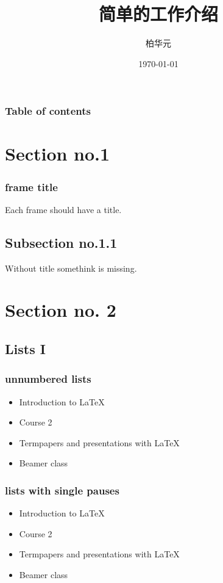 \documentclass[hyperref={pdfpagelabels=false}]{beamer}
\title{简单的工作介绍}
\author{柏华元}
\date{\today}
\begin{document}
\begin{frame}
\titlepage
\end{frame} 


\begin{frame}
\frametitle{Table of contents}
\tableofcontents
\end{frame} 


\section{Section no.1} 
\begin{frame}
\frametitle{frame title} 
Each frame should have a title.
\end{frame}
\subsection{Subsection no.1.1  }
\begin{frame}
Without title somethink is missing. 
\end{frame}


\section{Section no. 2} 
\subsection{Lists I}
\begin{frame}
\frametitle{unnumbered lists}
\begin{itemize}
\item Introduction to  \LaTeX{}  
\item Course 2 
\item Termpapers and presentations with \LaTeX{}  
\item Beamer class
\end{itemize} 
\end{frame}

\begin{frame}\frametitle{lists with single pauses}
\begin{itemize}
\item Introduction to  \LaTeX{}  \pause 
\item Course 2 \pause 
\item Termpapers and presentations with \LaTeX{}  \pause 
\item Beamer class
\end{itemize} 
\end{frame}
\end{document}
